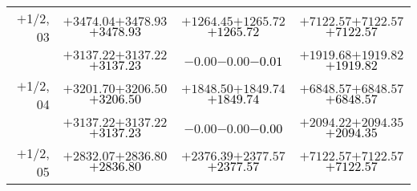 \documentclass[compress]{beamer}
\begin{document}
\begin{frame}
{\begin{tabular}{r | c | c | c}
$+$1/2, 03 & $+3474.04$\hspace{0.1 cm}$+3478.93$\hspace{0.1 cm}\textcolor{black}{$+3478.93$} & $+1264.45$\hspace{0.1 cm}$+1265.72$\hspace{0.1 cm}\textcolor{black}{$+1265.72$} & $+7122.57$\hspace{0.1 cm}$+7122.57$\hspace{0.1 cm}\textcolor{black}{$+7122.57$} \\
           & $+3137.22$\hspace{0.1 cm}$+3137.22$\hspace{0.1 cm}\textcolor{black}{$+3137.23$} & $-0.00$\hspace{0.1 cm}$-0.00$\hspace{0.1 cm}\textcolor{black}{$-0.01$} & $+1919.68$\hspace{0.1 cm}$+1919.82$\hspace{0.1 cm}\textcolor{black}{$+1919.82$} \\
$+$1/2, 04 & $+3201.70$\hspace{0.1 cm}$+3206.50$\hspace{0.1 cm}\textcolor{black}{$+3206.50$} & $+1848.50$\hspace{0.1 cm}$+1849.74$\hspace{0.1 cm}\textcolor{black}{$+1849.74$} & $+6848.57$\hspace{0.1 cm}$+6848.57$\hspace{0.1 cm}\textcolor{black}{$+6848.57$} \\
           & $+3137.22$\hspace{0.1 cm}$+3137.22$\hspace{0.1 cm}\textcolor{black}{$+3137.23$} & $-0.00$\hspace{0.1 cm}$-0.00$\hspace{0.1 cm}\textcolor{black}{$-0.00$} & $+2094.22$\hspace{0.1 cm}$+2094.35$\hspace{0.1 cm}\textcolor{black}{$+2094.35$} \\
$+$1/2, 05 & $+2832.07$\hspace{0.1 cm}$+2836.80$\hspace{0.1 cm}\textcolor{black}{$+2836.80$} & $+2376.39$\hspace{0.1 cm}$+2377.57$\hspace{0.1 cm}\textcolor{black}{$+2377.57$} & $+7122.57$\hspace{0.1 cm}$+7122.57$\hspace{0.1 cm}\textcolor{black}{$+7122.57$} \\

\end{tabular}}
\end{frame}
\end{document}
